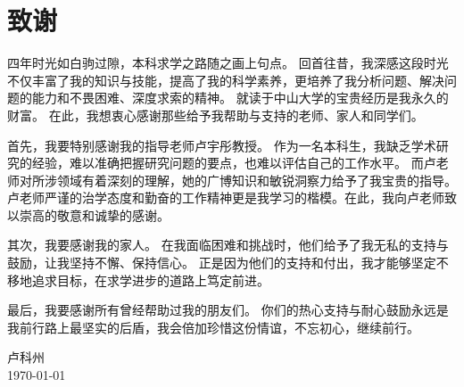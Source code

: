 
\chapter{致谢}

四年时光如白驹过隙，本科求学之路随之画上句点。
回首往昔，我深感这段时光不仅丰富了我的知识与技能，提高了我的科学素养，更培养了我分析问题、解决问题的能力和不畏困难、深度求索的精神。
就读于中山大学的宝贵经历是我永久的财富。
在此，我想衷心感谢那些给予我帮助与支持的老师、家人和同学们。

首先，我要特别感谢我的指导老师卢宇彤教授。
作为一名本科生，我缺乏学术研究的经验，难以准确把握研究问题的要点，也难以评估自己的工作水平。
而卢老师对所涉领域有着深刻的理解，她的广博知识和敏锐洞察力给予了我宝贵的指导。
卢老师严谨的治学态度和勤奋的工作精神更是我学习的楷模。在此，我向卢老师致以崇高的敬意和诚挚的感谢。

其次，我要感谢我的家人。
在我面临困难和挑战时，他们给予了我无私的支持与鼓励，让我坚持不懈、保持信心。
正是因为他们的支持和付出，我才能够坚定不移地追求目标，在求学进步的道路上笃定前进。

最后，我要感谢所有曾经帮助过我的朋友们。
你们的热心支持与耐心鼓励永远是我前行路上最坚实的后盾，我会倍加珍惜这份情谊，不忘初心，继续前行。

\vskip 108pt
\begin{flushright}
	卢科州\makebox[1cm]{} \\
	\today
\end{flushright}

